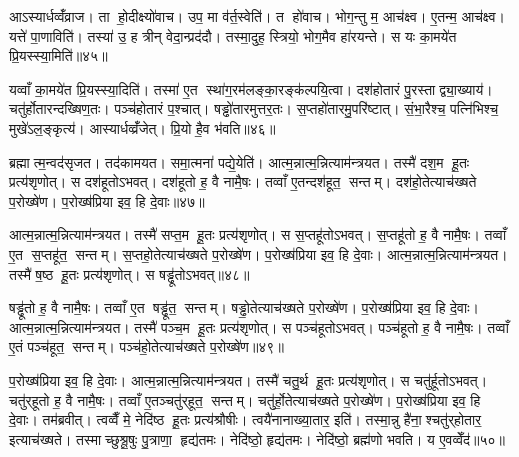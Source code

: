 आऽस्यार्धव्वँ॑व्राज। ता हो॒दीक्ष्यो॑वाच। उप॒ मा व॑र्त॒स्वेति॑। त हो॑वाच। भोग॒न्तु म॒ आच॑क्ष्व। ए॒तन्म॒ आच॑क्ष्व। यत्ते॑ पा॒णाविति॑। तस्या॑ उ॒ ह त्रीन् वेदा॒न्प्रद॑दौ। तस्मा॒दुह॒ स्त्रियो॒ भोग॒मैव हा॑रयन्ते। स यः का॒मये॑त प्रि॒यस्स्या॒मिति॑॥४५॥

यव्वाँ का॒मये॑त प्रि॒यस्स्या॒दिति॑। तस्मा॑ ए॒त स्था॑ग॒रम॑लङ्का॒रङ्क॑ल्पयि॒त्वा। दश॑होतारं पु॒रस्ताद्व्या॒ख्याय॑। चतु॑र्\mbox{}होतारन्दख्षिण॒तः। पञ्च॑होतारं प॒श्चात्। षड्ढो॑तारमुत्तर॒तः। स॒प्तहो॑तारमु॒परि॑ष्टात्। सं॒भा॒रैश्च॒ पत्नि॑भिश्च॒ मुखे॑ऽल॒ङ्कृत्य॑। आस्यार्धव्व्रँ॑जेत्। प्रि॒यो है॒व भ॑वति॥४६॥\anuvakamend[अ॒या॒न्य॒ल॒ङ्कृत्य॑ स्या॒मिति॑ भवति]

ब्रह्मात्म॒न्वद॑सृजत। तद॑कामयत। समा॒त्मना॑ पद्ये॒येति॑। आत्म॒न्नात्म॒न्नित्याम॑न्त्रयत। तस्मै॑ दश॒म हू॒तः प्रत्य॑शृणोत्। स दश॑हूतोऽभवत्। दश॑हूतो ह॒ वै नामै॒षः। तव्वाँ ए॒तन्दश॑हूत॒ सन्तम्। दश॑हो॒तेत्याच॑ख्षते प॒रोख्षे॑ण। प॒रोख्ष॑प्रिया इव॒ हि दे॒वाः॥४७॥

आत्म॒न्नात्म॒न्नित्याम॑न्त्रयत। तस्मै॑ सप्त॒म हू॒तः प्रत्य॑शृणोत्। स स॒प्तहू॑तोऽभवत्। स॒प्तहू॑तो ह॒ वै नामै॒षः। तव्वाँ ए॒त स॒प्तहू॑त॒ सन्तम्। स॒प्तहो॒तेत्याच॑ख्षते प॒रोख्षे॑ण। प॒रोख्ष॑प्रिया इव॒ हि दे॒वाः। आत्म॒न्नात्म॒न्नित्याम॑न्त्रयत। तस्मै॑ ष॒ष्ठ हू॒तः प्रत्य॑शृणोत्। स षड्ढू॑तोऽभवत्॥४८॥

षड्ढू॑तो ह॒ वै नामै॒षः। तव्वाँ ए॒त षड्ढू॑त॒ सन्तम्। षड्ढो॒तेत्याच॑ख्षते प॒रोख्षे॑ण। प॒रोख्ष॑प्रिया इव॒ हि दे॒वाः। आत्म॒न्नात्म॒न्नित्याम॑न्त्रयत। तस्मै॑ पञ्च॒म हू॒तः प्रत्य॑शृणोत्। स पञ्च॑हूतोऽभवत्। पञ्च॑हूतो ह॒ वै नामै॒षः। तव्वाँ ए॒तं पञ्च॑हूत॒ सन्तम्। पञ्च॑हो॒तेत्याच॑ख्षते प॒रोख्षे॑ण॥४९॥

प॒रोख्ष॑प्रिया इव॒ हि दे॒वाः। आत्म॒न्नात्म॒न्नित्याम॑न्त्रयत। तस्मै॑ चतु॒र्थ हू॒तः प्रत्य॑शृणोत्। स चतु॑र्\mbox{}हूतोऽभवत्। चतु॑र्‌हूतो ह॒ वै नामै॒षः। तव्वाँ ए॒तञ्चतु॑र्‌हूत॒ सन्तम्। चतु॑र्हो॒तेत्याच॑ख्षते प॒रोख्षे॑ण। प॒रोख्ष॑प्रिया इव॒ हि दे॒वाः। तम॑ब्रवीत्। त्वव्वैँ मे॒ नेदि॑ष्ठ हू॒तः प्रत्य॑श्रौषीः। त्वयै॑नानाख्या॒तार॒ इति॑। तस्मा॒न्नु है॑ना॒श्चतु॑र्‌होतार॒ इत्याच॑ख्षते। तस्माच्छुश्रू॒षुः पु॒त्राणा॒ हृद्य॑तमः। नेदि॑ष्ठो॒ हृद्य॑तमः। नेदि॑ष्ठो॒ ब्रह्म॑णो भवति। य ए॒वव्वेँद॑॥५०॥



